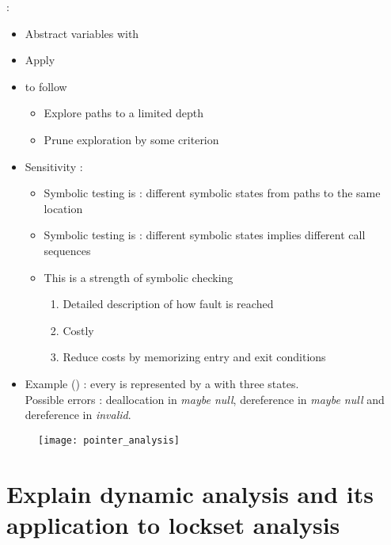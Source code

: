  : 
\begin{itemize}
    \item Abstract variables with 
    \item Apply 
    \item {} to follow 
    \begin{itemize}
        \item Explore paths to a limited depth
        \item Prune exploration by some criterion
    \end{itemize}
    \item Sensitivity :
     \begin{itemize}
        \item Symbolic testing is : different symbolic states from paths to the same location
        \item Symbolic testing is : different symbolic states implies different call sequences
        \item This is a strength of symbolic checking
        \begin{enumerate}
            \item Detailed description of how fault is reached
            \item Costly
            \item Reduce costs by memorizing entry and exit conditions
        \end{enumerate}
    \end{itemize}
    \item Example () : every  is represented by a  with three states.\\
    Possible errors : deallocation in \textit{maybe null}, dereference in \textit{maybe null} and dereference in \textit{invalid}.
\end{itemize}

\begin{figure}[H]
    \centering
    \texttt{[image: pointer\_analysis]}
\end{figure}

\section{Explain dynamic analysis and its application to lockset analysis}

